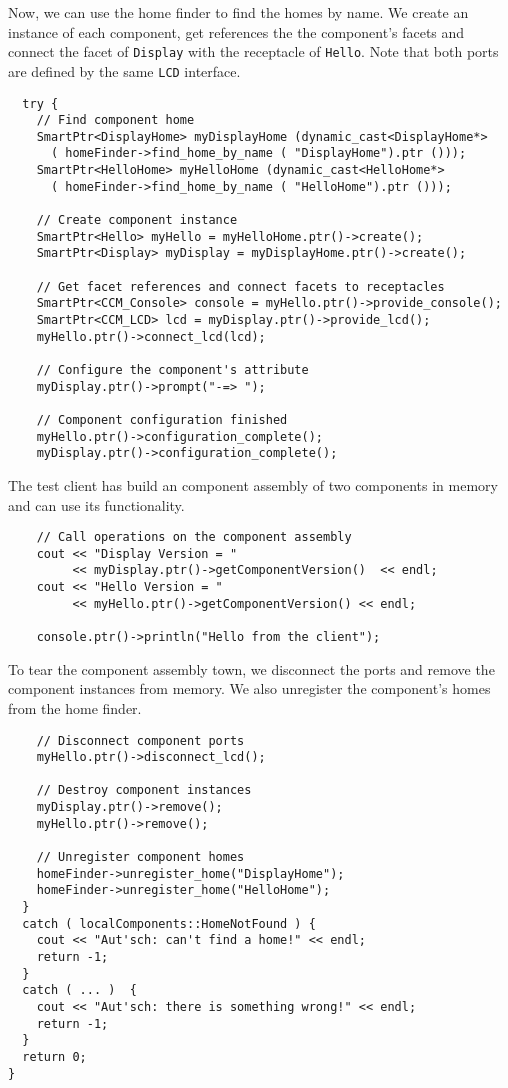 \noindent
Now, we can use the home finder to find the homes by name. We create an instance
of each component, get references the the component's facets and connect the
facet of {\tt Display} with the receptacle of {\tt Hello}. Note that both ports
are defined by the same {\tt LCD} interface.
\begin{small}
\begin{verbatim}
  try {
    // Find component home
    SmartPtr<DisplayHome> myDisplayHome (dynamic_cast<DisplayHome*>
      ( homeFinder->find_home_by_name ( "DisplayHome").ptr ()));
    SmartPtr<HelloHome> myHelloHome (dynamic_cast<HelloHome*>
      ( homeFinder->find_home_by_name ( "HelloHome").ptr ()));

    // Create component instance
    SmartPtr<Hello> myHello = myHelloHome.ptr()->create();
    SmartPtr<Display> myDisplay = myDisplayHome.ptr()->create();
 
    // Get facet references and connect facets to receptacles
    SmartPtr<CCM_Console> console = myHello.ptr()->provide_console();	
    SmartPtr<CCM_LCD> lcd = myDisplay.ptr()->provide_lcd();
    myHello.ptr()->connect_lcd(lcd);

    // Configure the component's attribute
    myDisplay.ptr()->prompt("-=> ");

    // Component configuration finished	
    myHello.ptr()->configuration_complete();
    myDisplay.ptr()->configuration_complete();
\end{verbatim}
\end{small}

\noindent
The test client has build an component assembly of two components in memory and
can use its functionality.
\begin{small}
\begin{verbatim}  
    // Call operations on the component assembly
    cout << "Display Version = " 
         << myDisplay.ptr()->getComponentVersion()  << endl;
    cout << "Hello Version = "  
         << myHello.ptr()->getComponentVersion() << endl;

    console.ptr()->println("Hello from the client");
\end{verbatim}
\end{small}

\noindent
To tear the component assembly town, we disconnect the ports and remove the
component instances from memory. We also unregister the component's homes from
the home finder.
\begin{small}	
\begin{verbatim}    
    // Disconnect component ports
    myHello.ptr()->disconnect_lcd();    

    // Destroy component instances
    myDisplay.ptr()->remove();
    myHello.ptr()->remove();

    // Unregister component homes
    homeFinder->unregister_home("DisplayHome");
    homeFinder->unregister_home("HelloHome");
  }
  catch ( localComponents::HomeNotFound ) {
    cout << "Aut'sch: can't find a home!" << endl;
    return -1;
  }
  catch ( ... )  {
    cout << "Aut'sch: there is something wrong!" << endl;
    return -1;
  }
  return 0;
}
\end{verbatim}
\end{small}

